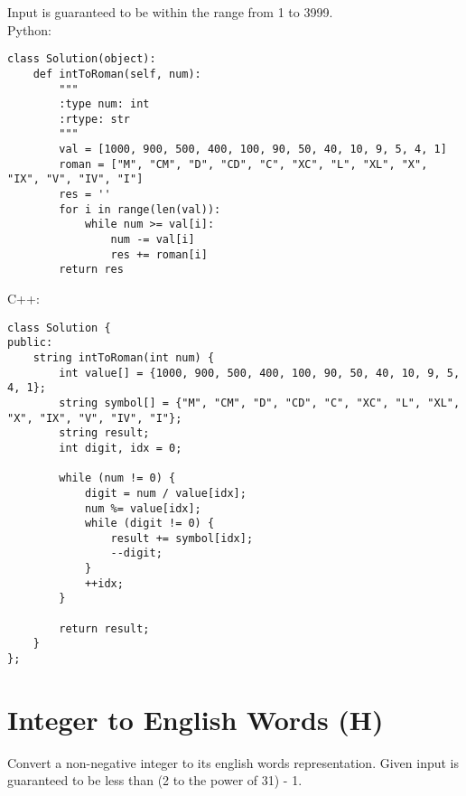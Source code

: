 Input is guaranteed to be within the range from 1 to 3999.\\

Python:
\begin{lstlisting}
class Solution(object):
    def intToRoman(self, num):
        """
        :type num: int
        :rtype: str
        """
        val = [1000, 900, 500, 400, 100, 90, 50, 40, 10, 9, 5, 4, 1]
        roman = ["M", "CM", "D", "CD", "C", "XC", "L", "XL", "X", "IX", "V", "IV", "I"]
        res = ''
        for i in range(len(val)):
            while num >= val[i]:
                num -= val[i]
                res += roman[i]
        return res
\end{lstlisting}   

C++:
\begin{lstlisting}
class Solution {
public:
    string intToRoman(int num) {
        int value[] = {1000, 900, 500, 400, 100, 90, 50, 40, 10, 9, 5, 4, 1};
        string symbol[] = {"M", "CM", "D", "CD", "C", "XC", "L", "XL", "X", "IX", "V", "IV", "I"};
        string result;
        int digit, idx = 0;
        
        while (num != 0) {
            digit = num / value[idx];
            num %= value[idx];
            while (digit != 0) {
                result += symbol[idx];
                --digit;
            }
            ++idx;
        }
        
        return result;
    }
};
\end{lstlisting}   

\section{Integer to English Words (H)}
Convert a non-negative integer to its english words representation. Given input is guaranteed to be less than (2 to the power of 31) - 1.\\

